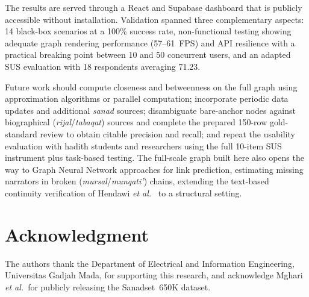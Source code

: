 \documentclass[conference]{IEEEtran}
\begin{document}
The results are served through a React and Supabase dashboard that is publicly
accessible without installation. Validation spanned three complementary aspects:
14 black-box scenarios at a 100\% success rate, non-functional testing showing
adequate graph rendering performance (57--61~FPS) and API resilience with a
practical breaking point between 10 and 50 concurrent users, and an adapted SUS
evaluation with 18 respondents averaging 71.23.

Future work should compute closeness and betweenness on the full graph using
approximation algorithms or parallel computation; incorporate periodic data
updates and additional \textit{sanad} sources; disambiguate bare-anchor nodes
against biographical (\textit{rijal}/\textit{tabaqat}) sources and complete the
prepared 150-row gold-standard review to obtain citable precision and recall; and
repeat the usability evaluation with hadith students and researchers using the
full 10-item SUS instrument plus task-based testing. The full-scale graph built
here also opens the way to Graph Neural Network approaches for link prediction,
estimating missing narrators in broken (\textit{mursal}/\textit{munqati'}) chains,
extending the text-based continuity verification of Hendawi \textit{et al.}\
\cite{10974901} to a structural setting.

\section*{Acknowledgment}

The authors thank the Department of Electrical and Information Engineering,
Universitas Gadjah Mada, for supporting this research, and acknowledge Mghari
\textit{et al.}\ for publicly releasing the Sanadset~650K dataset.



\end{document}
